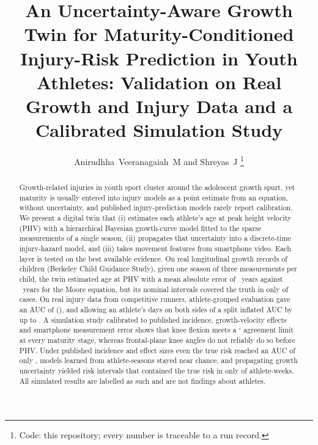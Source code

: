 \documentclass[journal]{IEEEtran}
\begin{document}
\title{An Uncertainty-Aware Growth Twin for Maturity-Conditioned Injury-Risk Prediction in Youth Athletes: Validation on Real Growth and Injury Data and a Calibrated Simulation Study}

\author{Anirudhha~Veeranagaiah~M and Shreyas~J%
\thanks{Code: this repository; every number is traceable to a run record.}}


\maketitle

\begin{abstract}
Growth-related injuries in youth sport cluster around the adolescent growth spurt, yet maturity
is usually entered into injury models as a point estimate from an equation, without
uncertainty, and published injury-prediction models rarely report calibration. We present a
digital twin that (i) estimates each athlete's age at peak height velocity (PHV) with a
hierarchical Bayesian growth-curve model fitted to the sparse measurements of a single season,
(ii) propagates that uncertainty into a discrete-time injury-hazard model, and (iii) takes
movement features from smartphone video. Each layer is tested on the best available evidence.
On real longitudinal growth records of \BerkChildren{} children (Berkeley Child Guidance
Study), given one season of three measurements per child, the twin estimated age at PHV with a
mean absolute error of \BerkTwinMAE{}~years against \BerkMooreMAE{}~years for the Moore
equation, but its nominal \SpecInterval{} intervals covered the truth in only \BerkCoverage{}
of cases. On real injury data from \RunRunners{} competitive runners, athlete-grouped evaluation gave an AUC of
\RunAucLogit{} (\RunAucLogitCI{}), and allowing an athlete's days on both sides of a split
inflated AUC by up to \RunInflBoost{}. A simulation study calibrated to published incidence,
growth-velocity effects and smartphone measurement error shows that knee flexion meets a
\SpecRmseLimit{}$^\circ$ agreement limit at every maturity stage, whereas frontal-plane knee
angles do not reliably do so before PHV. Under published incidence and effect sizes even the
true risk reached an AUC of only \SizeTrueAucLarge{}, models learned from \SizeLarge{}
athlete-seasons stayed near chance, and propagating growth uncertainty yielded risk intervals that
contained the true risk in only \PropCoverage{} of athlete-weeks. All simulated results are labelled
as such and are not findings about athletes.
\end{abstract}
\end{document}
